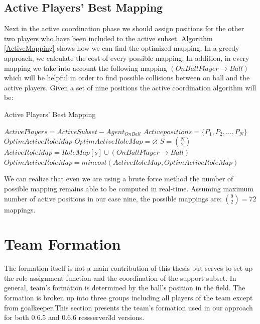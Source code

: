 \subsection{Active Players' Best Mapping}
Next in the active coordination phase we should assign positions for the other two players who have been included to the active subset. Algorithm \ref{ActiveMapping} shows how we can find the optimized mapping. In a greedy approach, we calculate the cost of every possible mapping. In addition, in every mapping we take into account the following mapping $(OnBallPlayer \rightarrow Ball)$ which will be helpful in order to find possible collisions between on ball and the active players. Given a set of nine positions the active coordination algorithm will be:
\begin{algorithm}[htb!]
\caption{Active Players' Best Mapping}
\label{ActiveMapping}
\begin{algorithmic}[1]
$ActivePlayers = ActiveSubset - Agent_{OnBall} $
\STATE $Activepositions = \lbrace P_{1},P_{2},...,P_{N} \rbrace $
$OptimActiveRoleMap$
\STATE $OptimActiveRoleMap = \varnothing $
\STATE $S = {{N}\choose{2}}$
\STATE $ActiveRoleMap = RoleMap[s] \cup (OnBallPlayer \rightarrow Ball)$
\STATE $OptimActiveRoleMap = mincost(ActiveRoleMap,OptimActiveRoleMap)$
\ENDFOR
\end{algorithmic}
\end{algorithm}
We can realize that even we are using a brute force method the number of possible mapping remains able to be computed in real-time. Assuming maximum number of active positions in our case nine, the possible mappings are: ${{9}\choose{2}} = 72$ mappings.

\section{Team Formation}
The formation itself is not a main contribution of this thesis but serves to set up the role assignment function and the coordination of the support subset. In general, team's formation is determined by the ball's position in the field. The formation is broken up into three groups including all players of the team except from goalkeeper.This section presents the team's formation used in our approach for both 0.6.5 and 0.6.6 rcssserver3d versions.
